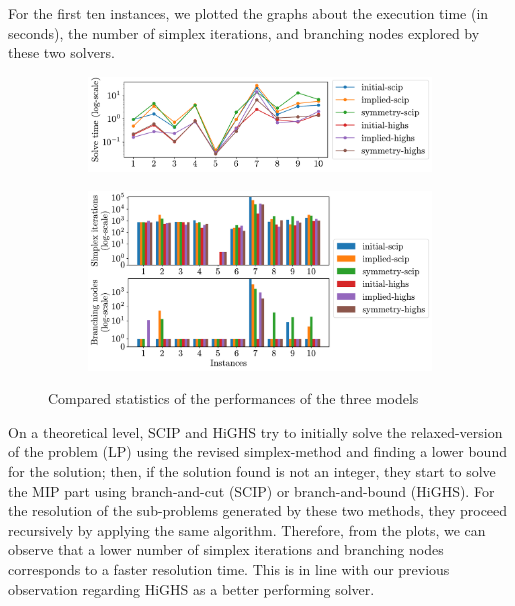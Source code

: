For the first ten instances, we plotted the graphs about the execution time (in seconds), the number of simplex iterations, and branching nodes explored by these two solvers.
\begin{figure}[ht]
    \centering
    \begin{subfigure}{0.8\linewidth}
        \centering
        \includegraphics[width=\linewidth]{img/mip/time.pdf}
    \end{subfigure}
    \begin{subfigure}{0.8\linewidth}
        \centering
        \includegraphics[width=\linewidth]{img/mip/simplex.pdf}
\end{subfigure}
    \caption{Compared statistics of the performances of the three models}
\end{figure}



On a theoretical level, SCIP and HiGHS try to initially solve the relaxed-version of the problem (LP) using the revised simplex-method and finding a lower bound for the solution; then, if the solution found is not an integer, they start to solve the MIP part using branch-and-cut (SCIP) or branch-and-bound (HiGHS). For the resolution of the sub-problems generated by these two methods, they proceed recursively by applying the same algorithm. Therefore, from the plots, we can observe that a lower number of simplex iterations and branching nodes corresponds to a faster resolution time. This is in line with our previous observation regarding HiGHS as a better performing solver.
